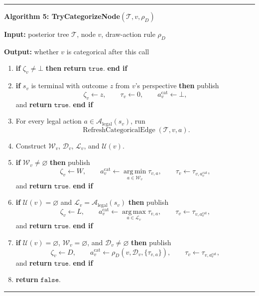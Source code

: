 \documentclass[11pt]{article}
\newcommand{\argmax}{\operatorname*{arg\,max}}
\newcommand{\argmin}{\operatorname*{arg\,min}}
\newcommand{\Tree}{\mathcal{T}}
\newcommand{\Legal}{\mathcal{A}_{\mathrm{legal}}}
\newcommand{\Unresolved}{\mathcal{U}}
\newcommand{\RefreshCategoricalEdge}{\operatorname{RefreshCategoricalEdge}}
\newenvironment{algorithmblock}[1]
{
  \par\medskip
  \noindent\hrule\par\smallskip
  \noindent\textbf{#1}
  \par\smallskip
}
{
  \par\smallskip\noindent\hrule\par\medskip
}
\newcommand{\Input}{\textbf{Input: }}
\newcommand{\Output}{\textbf{Output: }}
\newcommand{\Return}{\textbf{return }}
\newcommand{\If}{\textbf{if }}
\newcommand{\Then}{\textbf{ then }}
\newcommand{\EndIf}{\textbf{end if}}
\begin{document}
\begin{algorithmblock}{Algorithm 5: TryCategorizeNode\((\Tree,v,\rho_D)\)}

\Input posterior tree \(\Tree\), node \(v\), draw-action rule \(\rho_D\)

\Output whether \(v\) is categorical after this call

\begin{enumerate}[leftmargin=2em]
  \item \If \(\zeta_v\ne\bot\) \Then \Return \(\texttt{true}\). \EndIf

  \item \If \(s_v\) is terminal with outcome \(z\) from \(v\)'s perspective
  \Then publish
  \[
  \zeta_v\gets z,
  \qquad
  \tau_v\gets 0,
  \qquad
  a_v^{\mathrm{cat}}\gets\bot,
  \]
  and \Return \(\texttt{true}\). \EndIf

  \item For every legal action \(a\in\Legal(s_v)\), run
  \[
  \RefreshCategoricalEdge(\Tree,v,a).
  \]

  \item Construct \(\mathcal{W}_v\), \(\mathcal{D}_v\), \(\mathcal{L}_v\), and
  \(\Unresolved(v)\).

  \item \If \(\mathcal{W}_v\ne\varnothing\) \Then publish
  \[
  \zeta_v\gets W,
  \qquad
  a_v^{\mathrm{cat}}\gets\argmin_{a\in\mathcal{W}_v}\tau_{v,a},
  \qquad
  \tau_v\gets\tau_{v,a_v^{\mathrm{cat}}},
  \]
  and \Return \(\texttt{true}\). \EndIf

  \item \If \(\Unresolved(v)=\varnothing\) and \(\mathcal{L}_v=\Legal(s_v)\)
  \Then publish
  \[
  \zeta_v\gets L,
  \qquad
  a_v^{\mathrm{cat}}\gets\argmax_{a\in\mathcal{L}_v}\tau_{v,a},
  \qquad
  \tau_v\gets\tau_{v,a_v^{\mathrm{cat}}},
  \]
  and \Return \(\texttt{true}\). \EndIf

  \item \If \(\Unresolved(v)=\varnothing\), \(\mathcal{W}_v=\varnothing\), and
  \(\mathcal{D}_v\ne\varnothing\) \Then publish
  \[
  \zeta_v\gets D,
  \qquad
  a_v^{\mathrm{cat}}\gets\rho_D(v,\mathcal{D}_v,\{\tau_{v,a}\}),
  \qquad
  \tau_v\gets\tau_{v,a_v^{\mathrm{cat}}},
  \]
  and \Return \(\texttt{true}\). \EndIf

  \item \Return \(\texttt{false}\).
\end{enumerate}

\end{algorithmblock}
\end{document}
